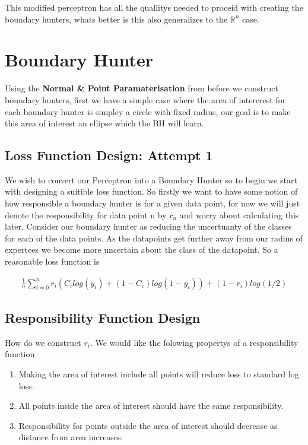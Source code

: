 \documentclass{article}
\begin{document}
This modified perceptron has all the quallitys needed to proceid with creating the boundary hunters, whats better is this also generalizes to the $\mathbb{R}^n$ case.

\section{Boundary Hunter}
Using the \textbf{Normal \& Point Paramaterisation} from before we construct boundary hunters, first we have a simple case where the area of intererest for each boundary hunter is simpley a circle with fixed radius, our goal is to make this area of interest an ellipse which the BH will learn.

\subsection{Loss Function Design: Attempt 1}
We wish to convert our Perceptron into a Boundary Hunter so to begin we start with designing a suitible loss function. So firstly we want to have some notion of how responsible a boundary hunter is for a given data point, for now we will just denote the responsibility for data point n by $r_n$ and worry about calculating this later. Consider our boundary hunter as reducing the uncertuanty of the classes for each of the data points. As the datapoints get further away from our radius of expertees we become more uncertain about the class of the datapoint. So a reasonable loss function is 

\begin{align}
\frac{1}{n} \sum_{i=0}^n r_i(C_i log(y_i) + (1-C_i)log(1-y_i)) + (1-r_i) log(1/2)
\end{align}


\subsection{Responsibility Function Design}
How do we construct $r_i$. We would like the folowing propertys of a responsibility function

\begin{enumerate}
\item Making the area of interest include all points will reduce loss to standard log loss.
\item All points inside the area of interest should have the same responsibility.
\item Responsibility for points outside the area of interest should decrease as distance from area increases.
\end{enumerate}
\end{document}
